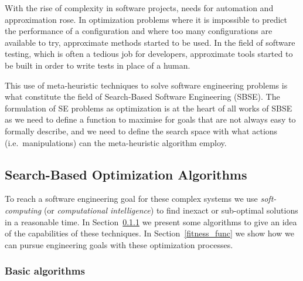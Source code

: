 \documentclass[11pt]{sdm}
\begin{document}
With the rise of complexity in software projects, needs for automation and approximation rose.
In optimization problems where it is impossible to predict the performance of a configuration and where too many configurations are available to try, approximate methods started to be used.
In the field of software testing, which is often a tedious job for developers, approximate tools started to be built in order to write tests in place of a human.

This use of meta-heuristic techniques to solve software engineering problems is what constitute the field of Search-Based Software Engineering (SBSE).
The formulation of SE problems as optimization is at the heart of all works of SBSE as we need to define a function to maximise for goals that are not always easy to formally describe, and we need to define the search space with what actions (i.e.\ manipulations) can the meta-heuristic algorithm employ.

\subsection{Search-Based Optimization Algorithms}
\label{example_algo}
To reach a software engineering goal for these complex systems we use \textit{soft-computing} (or \textit{computational intelligence}) to find inexact or sub-optimal solutions in a reasonable time.
In Section~\ref{basic_algo} we present some algorithms to give an idea of the capabilities of these techniques.
In Section~\ref{fitness_func} we show how we can pursue engineering goals with these optimization processes.

\subsubsection{Basic algorithms}
\label{basic_algo}
\end{document}
